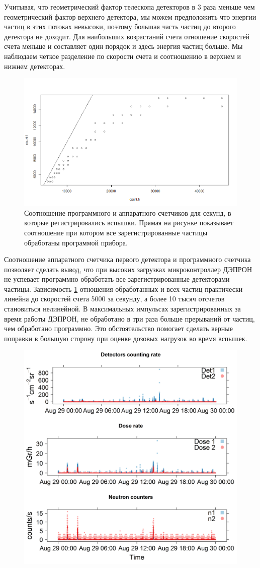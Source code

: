Учитывая, что геометрический фактор телескопа детекторов в 3 раза меньше чем геометрический фактор верхнего детектора, мы можем предположить что энергии частиц в этих потоках невысоки, поэтому большая часть частиц до второго детектора не доходит.	Для наибольших возрастаний счета отношение скоростей счета меньше и составляет один порядок и здесь энергия частиц больше. Мы наблюдаем четкое разделение по скорости счета и соотношению в верхнем и нижнем детекторах. 
\begin{figure}[h]
	\centering
	\includegraphics[width=0.7\linewidth]{images/Flash/Rplot04}
	\caption{Соотношение программного и аппаратного счетчиков для секунд, в которые регистрировались вспышки. Прямая на рисунке показывает соотношение при котором все зарегистрированные частицы обработаны программой прибора.}
	\label{fig:rplot04}
\end{figure}
Соотношение аппаратного счетчика первого детектора и программного счетчика позволяет сделать вывод, что при высоких загрузках микроконтроллер ДЭПРОН не успевает программно обработать все зарегистрированные детекторами частицы. Зависимость \ref{fig:rplot04} отношения обработанных и всех частиц практически линейна до скоростей счета 5000 за секунду, а более 10 тысяч отсчетов становиться нелинейной. В максимальных импульсах зарегистрированных за время работы ДЭПРОН, не обработано в три раза больше прерываний от частиц, чем обработано программно. Это обстоятельство помогает сделать верные поправки в большую сторону при оценке дозовых нагрузок во время вспышек. 
\begin{figure}
	\centering
	\includegraphics[width=0.7\linewidth]{images/results/depron_sec_log_new08-29-16}
	\caption{}
	\label{fig:depronseclognew08-29-16}
\end{figure}


